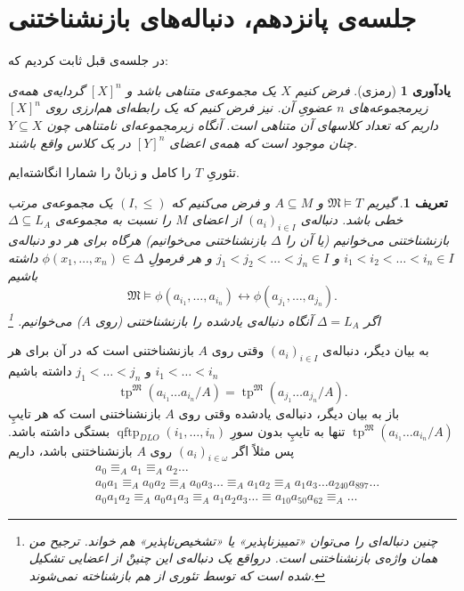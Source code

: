 \documentclass[12pt,a4paper]{report}
\theoremstyle{colorhead}
\newtheorem{defn}[thm]{تعریف}
\newtheorem{yad}[thm]{یادآوری}
\DeclareMathOperator{\qftp}{qftp}
\DeclareMathOperator{\tp}{tp}
\begin{document}
\section{جلسه‌ی پانزدهم،‌ دنباله‌های بازنشناختنی}
در جلسه‌ی قبل ثابت کردیم که:
\begin{yad}[رمزی]
فرض کنیم 
$X$
یک مجموعه‌ی متناهی باشد و 
$[X]^n$
گردایه‌ی همه‌ی زیرمجموعه‌های
$n$
عضویِ آن. نیز فرض کنیم که  یک
رابطه‌ای هم‌ارزی روی
$[X]^n$
داریم که تعداد کلاسهای آن
متناهی
است. آنگاه زیرمجموعه‌ای نامتناهی چون
$Y\subseteq X$
چنان موجود است که همه‌ی اعضای
$[Y]^n$
در یک کلاس واقع باشند.
\end{yad}
تئوریِ
$T$
را کامل و زبانْ را شمارا انگاشته‌ایم. 
\begin{defn}
گیریم
$\mathfrak{M}\models T$
و
$A\subseteq M$
و فرض می‌کنیم که
$(I,\leq)$
یک مجموعه‌ی مرتب خطی باشد. دنباله‌ی
$(a_i)_{i\in I}$
از اعضای
$M$
را
نسبت به
مجموعه‌ی
$\Delta\subseteq L_A$
بازنشناختنی 
می‌خوانیم 
(یا آن را 
$\Delta$
بازنشناختنی می‌خوانیم)
هرگاه
برای هر دو دنباله‌ی
$i_1<i_2<\ldots<i_n\in I$
و
$j_1<j_2<\ldots<j_n\in I$
و هر فرمولِ
$\phi(x_1,\ldots,x_n)\in \Delta$
داشته باشیم
\[
\mathfrak{M}\models \phi(a_{i_1},\ldots,a_{i_n})\leftrightarrow \phi(a_{j_1},\ldots,a_{j_n}).
\]
اگر
$\Delta=L_A$
آنگاه دنباله‌ی یادشده را بازنشناختنی 
(روی
$A$)
می‌خوانیم. 
\footnote{ 
چنین دنباله‌ای را می‌توان «تمییزناپذیر» یا «تشخیص‌ناپذیر» هم خواند. ترجیح من همان واژه‌ی 
بازنشناختنی است. درواقع  یک دنباله‌ی این چنینْ
از اعضایی تشکیل شده است که توسط تئوری از هم بازشناخته نمی‌شوند. 
}
\end{defn}
به بیان دیگر، دنباله‌ی
$(a_i)_{i\in I}$
وقتی 
روی
$A$
بازنشناختنی است که در آن برای هر
$i_1<\ldots<i_n$
و
$j_1<\ldots<j_n$
داشته باشیم
\[
\tp^\mathfrak{M}(a_{i_1}\ldots a_{i_n}/A)=\tp^\mathfrak{M}(a_{j_1}\ldots a_{j_n}/A).
\]
باز به بیان دیگر، دنباله‌ی یادشده وقتی
روی
$A$
 بازنشناختنی است که هر تایپِ
$\tp^\mathfrak{M}(a_{i_1}\ldots a_{i_n}/A)$
تنها به تایپِ بدون سورِ
$\qftp_{DLO}(i_1,\ldots,i_n)$
بستگی داشته باشد. پس مثلاً اگر
$(a_i)_{i\in \omega}$
روی
$A$
بازنشناختنی باشد، داریم
\begin{align*}
& a_0 \equiv_A a_1 \equiv_A  a_2 \ldots \\
& a_0 a_1 \equiv_A a_0 a_2 \equiv_A a_0 a_3 \ldots \equiv_A a_1 a_2 \equiv_A a_1 a_3\ldots a_{240}a_{897}\ldots \\
& a_0 a_1 a_2 \equiv_A a_0 a_1 a_3\equiv_A a_1 a_2 a_3\ldots \equiv a_{10}a_{50}a_{62}\equiv_A \ldots
\end{align*}
\end{document}

